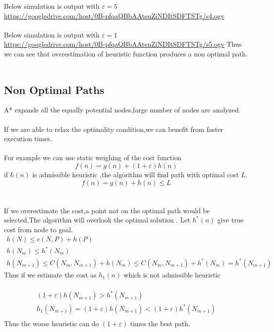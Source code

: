 \documentclass[fontsize=12pt, %
                             paper=a4, %
                             oneside, %
                             captions=tableheading,
                             index=totoc,
                             hyperref]{labbook}
\newcommand{\vurl}[1]{\url{#1}}
\begin{document}
Below simulation is output with $\varepsilon=5$\\
\vurl{https://googledrive.com/host/0B-pfqaQBbAAtenZiNDItSDFTSTg/s4.ogv}
\\\\
Below simulation is output with $\varepsilon=1$\\
\vurl{https://googledrive.com/host/0B-pfqaQBbAAtenZiNDItSDFTSTg/s5.ogv}
Thus we can see that overestimation of heuristic function produces a non optimal path.
\\\\

\subsection{Non Optimal Paths}
A* expands all the equally potential nodes,large number of nodes are analyzed.
\\\\
If we are able to relax the optimality condition,we can benefit from faster
execution times.
\\\\
For example we can use static weighing of the cost function
\[
 f(n) = g(n) + (1+ \varepsilon) h(n)
\]
if $h(n)$ is admissible heuristic ,the algorithm will find path with optimal cost $L$.
\[
   f(n)=g(n)+h(n) \le L
\]
\\\\
If we overestimate the cost,a point not on the optimal path would be selected,The algorithm
will overlook the optimal solution .
Let $h^*(n)$ give true cost from node to goal.
\begin{eqnarray*}
 h(N) \le c(N,P) + h(P) \\
 h(N_m) \le h^*(N_m) \\
 h(N_{m+1}) \le C(N_m,N_{m+1})+h(N_m) \le C(N_m,N_{m+1}) + h^*(N_m) = h^*(N_{m+1})
\end{eqnarray*}
Thus if we estimate the cost as $h_1(n)$ which is not admissible heuristic
\\\\
\begin{eqnarray*}
(1+\varepsilon)h(N_{m+1}) > h^*(N_{m+1}) \\
h_1(N_{m+1})=(1+\varepsilon)h(N_{m+1})  < (1+\varepsilon)h^*(N_{m+1})  \\
\end{eqnarray*}
Thus the worse heuristic can do $(1+\varepsilon)$ times the best
path.
\\\\
\end{document}
